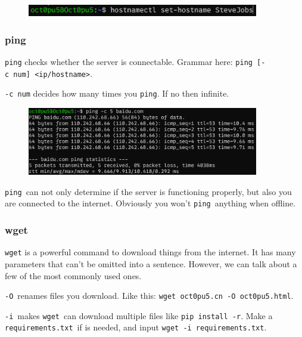 \documentclass[12pt]{ctexart}
\begin{document}
\begin{figure}[H]
    \centering
    \includegraphics[width=0.9\textwidth,keepaspectratio]{assets/Linux/1.9 Linux network commands/2.png}
\end{figure}

\subsubsection{\textbf{ping}}

\texttt{ping} checks whether the server is connectable. Grammar here:
\texttt{ping\ {[}-c\ num{]}\ \textless{}ip/hostname\textgreater{}}.

\texttt{-c\ num} decides how many times you \texttt{ping}. If no then
infinite.

\begin{figure}[H]
    \centering
    \includegraphics[width=0.9\textwidth,keepaspectratio]{assets/Linux/1.9 Linux network commands/3.png}
\end{figure}

\texttt{ping}\ can not only determine if the server is functioning
properly, but also you are connected to the internet. Obviously you
won't \texttt{ping}\ anything when offline.

\subsubsection{\textbf{wget}}

\texttt{wget} is a powerful command to download things from the
internet. It has many parameters that can't be omitted
into a sentence. However, we can talk about a few of the most commonly
used ones.

\texttt{-O}\ renames files you download. Like this:
\texttt{wget\ oct0pu5.cn\ -O\ oct0pu5.html}.

\texttt{-i}\ makes \texttt{wget}\ can download multiple files like
\texttt{pip\ install\ -r}. Make a \texttt{requirements.txt}\ if is
needed, and input \texttt{wget\ -i\ requirements.txt}.
\end{document}

